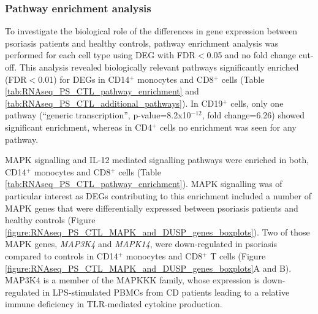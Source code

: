 \subsubsection{Pathway enrichment analysis}

To investigate the biological role of the differences in gene expression between psoriasis patients and healthy controls, pathway enrichment analysis was performed for each cell type using DEG with FDR$<$0.05 and no fold change cut-off. This analysis revealed biologically relevant pathways significantly enriched (FDR$<$0.01) for DEGs in CD14$^+$ monocytes and CD8$^+$ cells (Table \ref{tab:RNAseq_PS_CTL_pathway_enrichment} and \ref{tab:RNAseq_PS_CTL_additional_pathways}). In CD19$^+$ cells, only one pathway (“generic transcription”, p-value=8.2x10$^{-12}$, fold change=6.26) showed significant enrichment, whereas in CD4$^+$ cells no enrichment was seen for any pathway. 



MAPK signalling and IL-12 mediated signalling pathways were enriched in both, CD14$^+$ monocytes and CD8$^+$ cells (Table \ref{tab:RNAseq_PS_CTL_pathway_enrichment}). MAPK signalling was of particular interest as DEGs contributing to this enrichment included a number of MAPK genes that were differentially expressed between psoriasis patients and healthy controls (Figure \ref{figure:RNAseq_PS_CTL_MAPK_and_DUSP_genes_boxplots}). Two of those MAPK genes, \textit{MAP3K4} and \textit{MAPK14}, were down-regulated in psoriasis compared to controls in CD14$^+$ monocytes and CD8$^+$ T cells (Figure \ref{figure:RNAseq_PS_CTL_MAPK_and_DUSP_genes_boxplots}A and B). MAP3K4 is a member of the MAPKKK family, whose expression is down-regulated in LPS-stimulated PBMCs from CD patients leading to a relative immune deficiency in TLR-mediated cytokine production.

